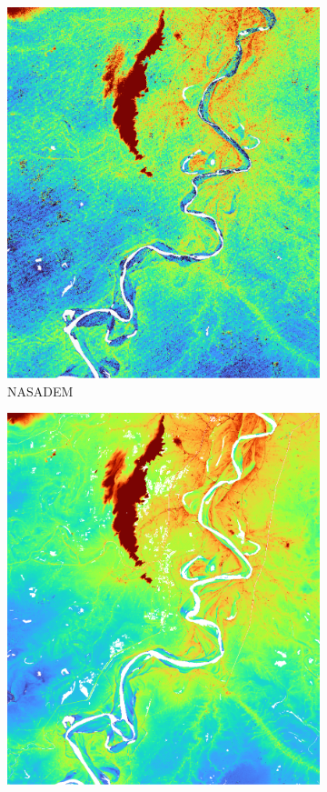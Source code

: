 \begin{figure}
  \centering
  \begin{subfigure}[t]
    {0.45\linewidth}
    \includegraphics[width=\linewidth]{nasadem.png}
    \caption{NASADEM}\label{fig:nasadem}
  \end{subfigure}
  \qquad
  \begin{subfigure}[t]
    {0.45\linewidth}
    \includegraphics[width=\linewidth]{copernicusdem.png}

\end{subfigure}
\end{figure}

